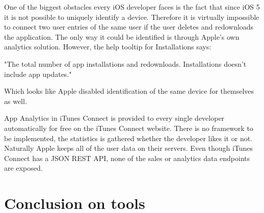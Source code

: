 One of the biggest obstacles every iOS developer faces is the fact that since iOS 5 \cite{udid} it is not possible to uniquely identify a device. Therefore it is virtually impossible to connect two user entries of the same user if the user deletes and redownloads the application. The only way it could be identified is through Apple's own analytics solution. However, the help tooltip for Installations says:

\bigbreak

"The total number of app installations and redownloads. Installations doesn't include app updates."

\bigbreak

Which looks like Apple disabled identification of the same device for themselves as well. 

App Analytics in iTunes Connect is provided to every single developer automatically for free on the iTunes Connect website. There is no framework to be implemented, the statistics is gathered whether the developer likes it or not. Naturally Apple keeps all of the user data on their servers. Even though iTunes Connect has a JSON REST API, none of the sales or analytics data endpoints are exposed.

\newpage

\section{Conclusion on tools}

